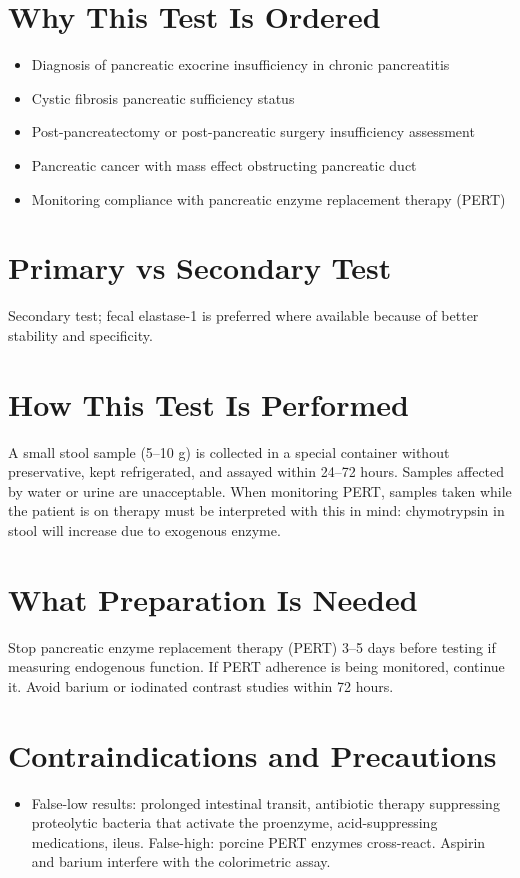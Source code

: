 \section*{Why This Test Is Ordered}
\begin{itemize}
  \item Diagnosis of pancreatic exocrine insufficiency in chronic pancreatitis \cite{dominguezmunoz2013diagnosis}
  \item Cystic fibrosis pancreatic sufficiency status
  \item Post-pancreatectomy or post-pancreatic surgery insufficiency assessment
  \item Pancreatic cancer with mass effect obstructing pancreatic duct
  \item Monitoring compliance with pancreatic enzyme replacement therapy (PERT)
\end{itemize}

\section*{Primary vs Secondary Test}
Secondary test; fecal elastase-1 is preferred where available because of better stability and specificity.

\section*{How This Test Is Performed}
A small stool sample (5--10 g) is collected in a special container without preservative, kept refrigerated, and assayed within 24--72 hours. Samples affected by water or urine are unacceptable. When monitoring PERT, samples taken while the patient is on therapy must be interpreted with this in mind: chymotrypsin in stool will increase due to exogenous enzyme.

\section*{What Preparation Is Needed}
Stop pancreatic enzyme replacement therapy (PERT) 3--5 days before testing if measuring endogenous function. If PERT adherence is being monitored, continue it. Avoid barium or iodinated contrast studies within 72 hours.

\section*{Contraindications and Precautions}
\begin{itemize}
  \item False-low results: prolonged intestinal transit, antibiotic therapy suppressing proteolytic bacteria that activate the proenzyme, acid-suppressing medications, ileus. False-high: porcine PERT enzymes cross-react. Aspirin and barium interfere with the colorimetric assay.
\end{itemize}
